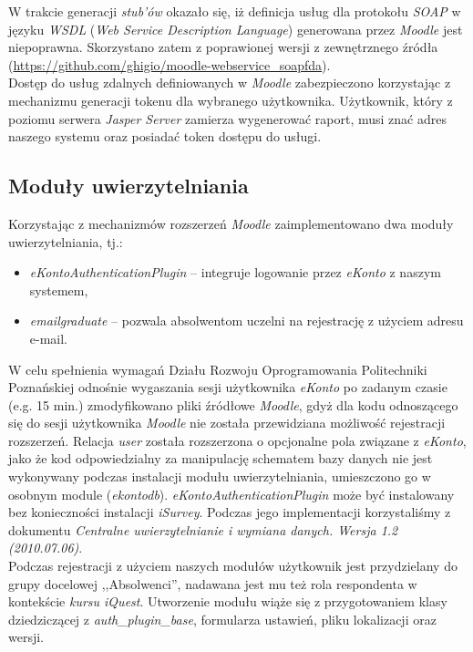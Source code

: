 W trakcie generacji \emph{stub'ów} okazało się, iż definicja usług dla protokołu \emph{SOAP} w języku \emph{WSDL} (\emph{Web Service Description Language}) generowana przez \emph{Moodle} jest niepoprawna. Skorzystano zatem z poprawionej wersji z zewnętrznego źródła (\url{https://github.com/ghigio/moodle-webservice_soapfda}).\\

Dostęp do usług zdalnych definiowanych w \emph{Moodle} zabezpieczono korzystając z mechanizmu generacji tokenu dla wybranego użytkownika. Użytkownik, który z poziomu serwera \emph{Jasper Server} zamierza wygenerować raport, musi znać adres naszego systemu oraz posiadać token dostępu do usługi.

\subsection{Moduły uwierzytelniania}
Korzystając z mechanizmów rozszerzeń \emph{Moodle} zaimplementowano dwa moduły uwierzytelniania, tj.:
\begin{itemize}
\item \emph{eKontoAuthenticationPlugin} -- integruje logowanie przez \emph{eKonto} z naszym systemem,
\item \emph{emailgraduate} -- pozwala absolwentom uczelni na rejestrację z użyciem adresu e-mail.
\end{itemize}

W celu spełnienia wymagań Działu Rozwoju Oprogramowania Politechniki Poznańskiej odnośnie wygaszania sesji użytkownika \emph{eKonto} po zadanym czasie (e.g. 15 min.) zmodyfikowano pliki źródłowe \emph{Moodle}, gdyż dla kodu odnoszącego się do sesji użytkownika \emph{Moodle} nie została przewidziana możliwość rejestracji rozszerzeń. Relacja \emph{user} została rozszerzona o opcjonalne pola związane z \emph{eKonto}, jako że kod odpowiedzialny za manipulację schematem bazy danych nie jest wykonywany podczas instalacji modułu uwierzytelniania, umieszczono go w osobnym module (\emph{ekontodb}). \emph{eKontoAuthenticationPlugin} może być instalowany bez konieczności instalacji \emph{iSurvey}. Podczas jego implementacji korzystaliśmy z dokumentu \emph{Centralne uwierzytelnianie i wymiana danych. Wersja 1.2 (2010.07.06)}.\\

Podczas rejestracji z użyciem naszych modułów użytkownik jest przydzielany do grupy docelowej ,,Absolwenci'', nadawana jest mu też rola respondenta w kontekście \emph{kursu iQuest}. Utworzenie modułu wiąże się z przygotowaniem klasy dziedziczącej z \emph{auth\_plugin\_base}, formularza ustawień, pliku lokalizacji oraz wersji.

